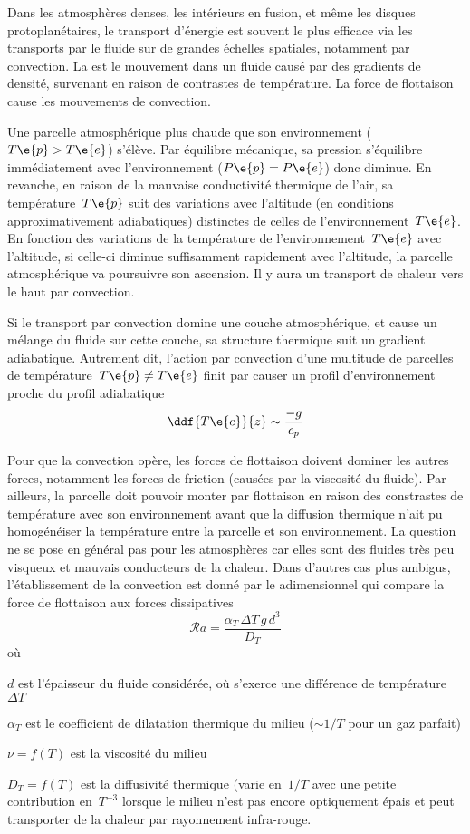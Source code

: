 
\sk
Dans les atmosphères denses, les intérieurs en fusion, et même les disques protoplanétaires, le transport d'énergie est souvent le plus efficace via les transports par le fluide sur de grandes échelles spatiales, notamment par convection. La  est le mouvement dans un fluide causé par des gradients de densité, survenant en raison de contrastes de température. La force de flottaison cause les mouvements de convection.

\sk
Une parcelle atmosphérique plus chaude que son environnement ($T\e{p}>T\e{e}$) s'élève. Par équilibre mécanique, sa pression s'équilibre immédiatement avec l'environnement ($P\e{p}=P\e{e}$) donc diminue. En revanche, en raison de la mauvaise conductivité thermique de l'air, sa température~$T\e{p}$ suit des variations avec l'altitude (en conditions approximativement adiabatiques) distinctes de celles de l'environnement~$T\e{e}$. En fonction des variations de la température de l'environnement~$T\e{e}$ avec l'altitude, si celle-ci diminue suffisamment rapidement avec l'altitude, la parcelle atmosphérique va poursuivre son ascension. Il y aura un transport de chaleur vers le haut par convection.

\sk
Si le transport par convection domine une couche atmosphérique, et cause un mélange du fluide sur cette couche, sa structure thermique suit un gradient adiabatique. Autrement dit, l'action par convection d'une multitude de parcelles de température~$T\e{p} \neq T\e{e}$ finit par causer un profil d'environnement proche du profil adiabatique 
\[ \ddf{T\e{e}}{z} \sim \frac{-g}{c_p} \]

\sk
Pour que la convection opère, les forces de flottaison doivent dominer les autres forces, notamment les forces de friction (causées par la viscosité du fluide). Par ailleurs, la parcelle doit pouvoir monter par flottaison en raison des constrastes de température avec son environnement avant que la diffusion thermique n'ait pu homogénéiser la température entre la parcelle et son environnement. La question ne se pose en général pas pour les atmosphères car elles sont des fluides très peu visqueux et mauvais conducteurs de la chaleur. Dans d'autres cas plus ambigus, l'établissement de la convection est donné par le  adimensionnel qui compare la force de flottaison aux forces dissipatives
\[ \mathcal{R}a = \frac{\alpha_T \, \Delta T \, g \, d^3}{D_{T}} \]
\noindent où
\begin{citemize}
\item $d$ est l'épaisseur du fluide considérée, où s'exerce une différence de température~$\Delta T$
\item $\alpha_T$ est le coefficient de dilatation thermique du milieu ($\sim 1/T$ pour un gaz parfait)
\item $\nu = f(T)$ est la viscosité du milieu
\item $D_T = f(T)$ est la diffusivité thermique (varie en~$1/T$ avec une petite contribution en~$T^{-3}$ lorsque le milieu n'est pas encore optiquement épais et peut transporter de la chaleur par rayonnement infra-rouge.
\end{citemize}

